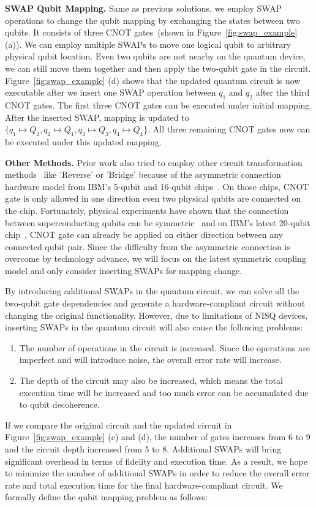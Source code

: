 \documentclass[journal,10pt,twocolumn]{IEEEtran}
\begin{document}
\textbf{SWAP Qubit Mapping.} Same as previous solutions, we employ SWAP operations to change the qubit mapping by exchanging the states between two qubits. It consists of three CNOT gates~(shown in Figure~\ref{fig:swap_example} (a)). 
We can employ multiple SWAPs to move one logical qubit to arbitrary physical qubit location.
Even two qubits are not nearby on the quantum device, we can still move them together and then apply the two-qubit gate in the circuit.
Figure~\ref{fig:swap_example} (d) shows that the updated quantum circuit is now executable after we insert one SWAP operation between $q_1$ and $q_2$ after the third CNOT gates. The first three CNOT gates can be executed under initial mapping. After the inserted SWAP, mapping is updated to $\{q_1\mapsto Q_2,q_2\mapsto Q_1,q_3\mapsto Q_3,q_4\mapsto Q_4\}$. All three remaining CNOT gates now can be executed under this updated mapping.



\textbf{Other Methods.} Prior work also tried to employ other circuit transformation methods~\cite{siraichi2018qubit} like 'Reverse' or 'Bridge' because of the asymmetric connection hardware model from IBM's 5-qubit and 16-qubit chips~\cite{IBMdevice}. On those chips, CNOT gate is only allowed in one direction even two physical qubits are connected on the chip. 
Fortunately, physical experiments have shown that the connection between superconducting qubits can be symmetric~\cite{chen2014qubit} and on IBM's latest 20-qubit chip~\cite{IBMdevice,tannu2018case}, CNOT gate can already be applied on either direction between any connected qubit pair. 
Since the difficulty from the asymmetric connection is overcome by technology advance, we will focus on the latest symmetric coupling model and only consider inserting SWAPs for mapping change. 



By introducing additional SWAPs in the quantum circuit, we can solve all the two-qubit gate dependencies and generate a hardware-compliant circuit without changing the original functionality. 
However, due to limitations of NISQ devices, inserting SWAPs in the quantum circuit will also cause the following problems:
\begin{enumerate}
\item The number of operations in the circuit is increased. Since the operations are imperfect and will introduce noise, the overall error rate will increase.
\item The depth of the circuit may also be increased, which means the total execution time will be increased and too much error can be accumulated due to qubit decoherence.
\end{enumerate}
If we compare the original circuit and the updated circuit in Figure~\ref{fig:swap_example} (c) and (d), the number of gates increases from 6 to 9 and the circuit depth increased from 5 to 8.
Additional SWAPs will bring significant overhead in terms of fidelity and execution time. 
As a result, we hope to minimize the number of additional SWAPs in order to reduce the overall error rate and total execution time for the final hardware-compliant circuit. 
We formally define the qubit mapping problem as follows:
\end{document}
